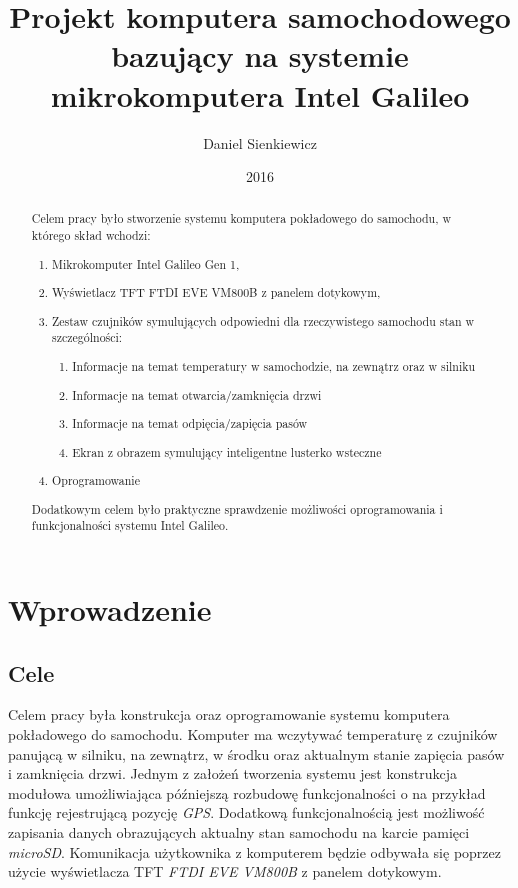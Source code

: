 \documentclass{xmgr}
\author   {Daniel Sienkiewicz}
\title    {Projekt komputera samochodowego bazujący na systemie mikrokomputera Intel Galileo}
\date     {2016}
\begin{document}
\begin{abstract}
Celem pracy było stworzenie systemu komputera pokładowego do samochodu, w którego skład wchodzi: 
\begin{enumerate}
	\item Mikrokomputer Intel Galileo Gen 1, 
	\item Wyświetlacz TFT FTDI EVE VM800B z panelem dotykowym, 
	\item Zestaw czujników symulujących odpowiedni dla rzeczywistego samochodu stan w szczególności:
	\begin{enumerate}
		\item Informacje na temat temperatury w samochodzie, na zewnątrz oraz w silniku
		\item Informacje na temat otwarcia/zamknięcia drzwi
		\item Informacje na temat odpięcia/zapięcia pasów
		\item Ekran z obrazem symulujący inteligentne lusterko wsteczne
	\end{enumerate}
	\item Oprogramowanie
\end{enumerate}

Dodatkowym celem było praktyczne sprawdzenie możliwości oprogramowania i funkcjonalności systemu Intel Galileo.

\end{abstract}
\maketitle

\chapter{Wprowadzenie}
\section{Cele}
Celem pracy była konstrukcja oraz oprogramowanie systemu komputera pokładowego do samochodu. Komputer ma wczytywać temperaturę z czujników panującą w silniku, na zewnątrz, w środku oraz aktualnym stanie zapięcia pasów i zamknięcia drzwi. Jednym z założeń tworzenia systemu jest konstrukcja modułowa umożliwiająca późniejszą rozbudowę funkcjonalności o na przykład funkcję rejestrującą pozycję \emph{GPS}. Dodatkową funkcjonalnością jest możliwość zapisania danych obrazujących aktualny stan samochodu na karcie pamięci \emph{microSD}. Komunikacja użytkownika z komputerem będzie odbywała się poprzez użycie wyświetlacza TFT \emph{FTDI EVE VM800B} z panelem dotykowym.
\end{document}
